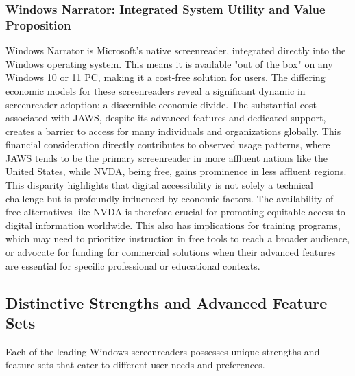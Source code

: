 \subsubsection{Windows Narrator: Integrated System Utility and Value Proposition}
Windows Narrator is Microsoft's native screenreader, integrated directly into the Windows operating system. This means it is available "out of the box" on any Windows 10 or 11 PC, making it a cost-free solution for users.\supercite{kingsbury2025}
The differing economic models for these screenreaders reveal a significant dynamic in screenreader adoption: a discernible economic divide. The substantial cost associated with JAWS, despite its advanced features and dedicated support, creates a barrier to access for many individuals and organizations globally. This financial consideration directly contributes to observed usage patterns, where JAWS tends to be the primary screenreader in more affluent nations like the United States, while NVDA, being free, gains prominence in less affluent regions.\supercite{kingsbury2025} This disparity highlights that digital accessibility is not solely a technical challenge but is profoundly influenced by economic factors. The availability of free alternatives like NVDA is therefore crucial for promoting equitable access to digital information worldwide. This also has implications for training programs, which may need to prioritize instruction in free tools to reach a broader audience, or advocate for funding for commercial solutions when their advanced features are essential for specific professional or educational contexts.

\subsection{Distinctive Strengths and Advanced Feature Sets}
Each of the leading Windows screenreaders possesses unique strengths and feature sets that cater to different user needs and preferences.
